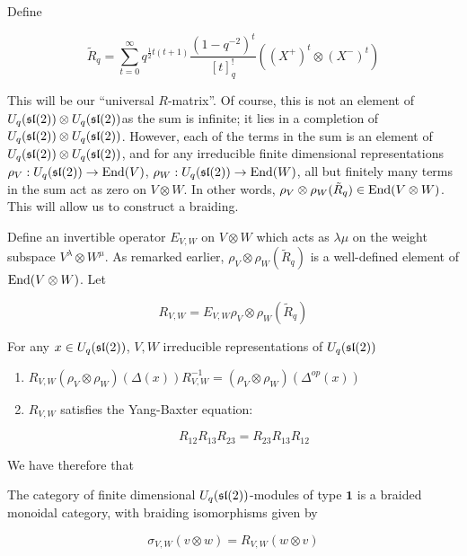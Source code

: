 Define 

\begin{equation}
\tilde{R}_q = \sum_{t=0}^\infty q^{\frac{1}{2} t(t+1)} \frac{(1-q^{-2})^t}{[t]_q^{!}} ((X^+)^t \otimes (X^-)^t)
\end{equation}

This will be our ``universal $R$-matrix''. Of course, this is not an element of
$U_q(\mathfrak{sl}(2)) \otimes U_q(\mathfrak{sl}(2))$as the sum is infinite; it lies in a
completion of $U_q(\mathfrak{sl}(2)) \otimes U_q(\mathfrak{sl}(2))$. However, each of the terms
in the sum is an element of $U_q(\mathfrak{sl}(2)) \otimes U_q(\mathfrak{sl}(2))$, and for any
irreducible finite dimensional representations $\rho_V : U_q(\mathfrak{sl}(2)) \to
\operatorname{End}(V)$, $\rho_W : U_q(\mathfrak{sl}(2)) \to \operatorname{End}(W)$, all but finitely many terms in the
sum act as zero on $V \otimes W$. In other words, $\rho_V \otimes \rho_W
(\tilde{R}_q) \in \operatorname{End}(V \otimes W)$. This will allow us to construct a
braiding.


Define an invertible operator $E_{V,W}$ on $V \otimes W$ which acts as
$\lambda\mu$ on the weight subspace $V^\lambda \otimes W^\mu$. As remarked
earlier, $\rho_V \otimes \rho_W (\tilde{R}_q) $ is a well-defined element of
$\operatorname{End}(V \otimes W)$. Let 

\begin{equation}
R_{V,W} = E_{V,W} \rho_V \otimes \rho_W (\tilde{R}_q)
\end{equation}

\begin{claim}
For any $x \in U_q(\mathfrak{sl}(2))$, $V,W$ irreducible representations of $U_q(\mathfrak{sl}(2))$
\begin{enumerate}
\item $R_{V,W} (\rho_V \otimes \rho_W) (\Delta(x)) R^{-1}_{V,W} = (\rho_{V} \otimes \rho_W)(\Delta^{op}(x))$
\item $R_{V,W}$  satisfies the Yang-Baxter equation: 

\begin{equation}
R_{12} R_{13} R_{23} = R_{23} R_{13} R_{12}
\end{equation}
\end{enumerate}
\end{claim}

We have therefore that 

\begin{theorem}
The category of finite dimensional $U_q(\mathfrak{sl}(2))$-modules of type $\mathbf{1}$ is a braided monoidal category, with braiding isomorphisms given by 

\begin{equation}
\sigma_{V,W}(v \otimes w) = R_{V,W}(w \otimes v)
\end{equation}
\end{theorem}


